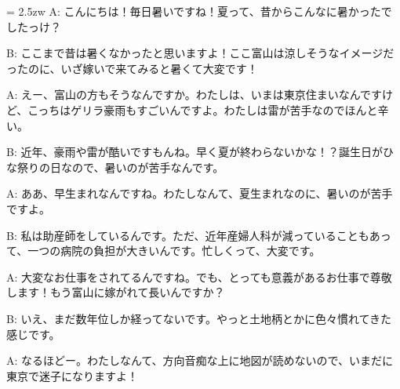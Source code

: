 \documentclass[11pt]{amsart}
\title{}
\author{}
\newenvironment{hangall}[1]{\hangindent = 2.5zw\everypar{\hangindent = 2.5zw}}{}
\begin{document}
\maketitle
\begin{hangall}{}%
A: こんにちは！毎日暑いですね！夏って、昔からこんなに暑かったでしたっけ？



B: ここまで昔は暑くなかったと思いますよ！ここ富山は涼しそうなイメージだったのに、いざ嫁いで来てみると暑くて大変です！



A: えー、富山の方もそうなんですか。わたしは、いまは東京住まいなんですけど、こっちはゲリラ豪雨もすごいんですよ。わたしは雷が苦手なのでほんと辛い。



B: 近年、豪雨や雷が酷いですもんね。早く夏が終わらないかな！？誕生日がひな祭りの日なので、暑いのが苦手なんです。



A: ああ、早生まれなんですね。わたしなんて、夏生まれなのに、暑いのが苦手ですよ。



B: 私は助産師をしているんです。ただ、近年産婦人科が減っていることもあって、一つの病院の負担が大きいんです。忙しくって、大変です。



A: 大変なお仕事をされてるんですね。でも、とっても意義があるお仕事で尊敬します！もう富山に嫁がれて長いんですか？



B: いえ、まだ数年位しか経ってないです。やっと土地柄とかに色々慣れてきた感じです。



A: なるほどー。わたしなんて、方向音痴な上に地図が読めないので、いまだに東京で迷子になりますよ！\end{hangall}
\end{document}

